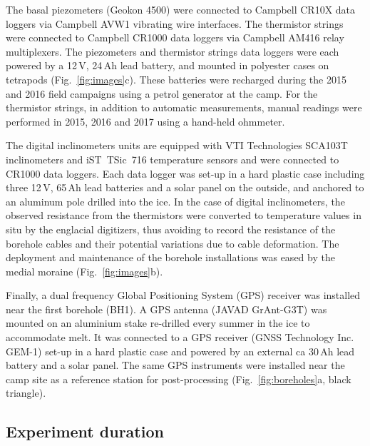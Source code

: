 \documentclass[utf8]{article}
\begin{document}
    The basal piezometers (Geokon 4500) were connected to Campbell CR10X data
    loggers via Campbell AVW1 vibrating wire interfaces. The thermistor strings
    \citep[NTC~Fenwal 135-103FAG-J01,][]{Ryser.2014} were connected to Campbell
    CR1000 data loggers via Campbell AM416 relay multiplexers. The piezometers
    and thermistor strings data loggers were each powered by a 12\,V, 24\,Ah
    lead battery, and mounted in polyester cases on tetrapods
    (Fig.~\ref{fig:images}c). These batteries were recharged during the 2015
    and 2016 field campaigns using
    a petrol generator at the camp. For the thermistor strings, in addition to
    automatic measurements, manual readings were performed in 2015, 2016 and
    2017 using a hand-held ohmmeter.

    The digital inclinometers units \citep[DIBOSS,][]{Ryser.2014,
    Ryser.etal.2014, Ryser.etal.2014a} are equipped with VTI Technologies
    SCA103T inclinometers and iST~TSic~716 temperature sensors and
    were connected to CR1000 data loggers. Each data logger
    was set-up in a hard plastic case including three 12\,V, 65\,Ah lead
    batteries and a solar panel on the outside, and anchored to an aluminum
    pole drilled into the ice.
    In the case of digital inclinometers, the observed resistance from the
    thermistors were converted to temperature values in situ by the englacial
    digitizers, thus avoiding to record the resistance of the borehole cables
    and their potential variations due to cable deformation. The deployment and
    maintenance of the borehole installations was eased by the medial moraine
    (Fig.~\ref{fig:images}b).

    Finally, a dual frequency Global Positioning System (GPS) receiver was
    installed near the first borehole (BH1). A GPS antenna (JAVAD GrAnt-G3T)
    was mounted on an aluminium stake re-drilled every summer in the ice to
    accommodate melt. It was connected to a GPS receiver (GNSS Technology
    Inc. GEM-1) set-up in a hard plastic case and powered by an external ca
    30\,Ah lead battery and a solar panel. The same GPS instruments were
    installed near the camp site as a reference station for post-processing
    (Fig.~\ref{fig:boreholes}a, black triangle).


\subsection{Experiment duration}
\end{document}
